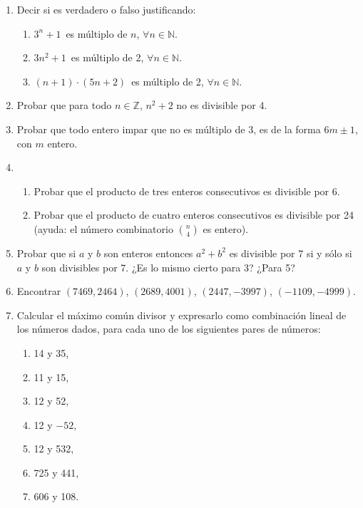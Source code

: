 \documentclass[a4paper,12pt,twoside,spanish,reqno]{amsbook}
\numberwithin{equation}{section}
\begin{document}
\begin{enumerate}
\item Decir si es verdadero o falso justificando:
  \begin{enumerate}
  \item $3^n+1$\, es múltiplo de $n$, $\forall n \in {\mathbb N}$.
  \item $3n^2+1$\, es múltiplo de 2, $\forall n \in {\mathbb N}$.
  \item $(n+1)\cdot (5n+2)$\, es múltiplo de 2, $\forall n \in {\mathbb N}$.
  \end{enumerate}


\item Probar que para todo $n \in {\mathbb Z}$, $n^2 + 2$ no es divisible por 4.


\item Probar que todo entero impar que no es múltiplo de 3, es de la forma $6m\pm 1$, con $m$ entero.


\item 
\begin{enumerate}
 \item Probar que el producto de tres enteros consecutivos es divisible por 6.
 \item Probar que el producto de cuatro enteros consecutivos es divisible por 24 (ayuda: el número combinatorio $\binom{n}{4}$ es entero).
\end{enumerate}


\item Probar que si $a$ y $b$ son enteros entonces $a^2+b^2$ es divisible por 7 si y sólo si $a$ y $b$ son divisibles por 7.
¿Es lo mismo cierto para 3? ¿Para 5?



\item Encontrar $(7469,2464)$, $(2689,4001)$, $(2447,-3997)$, $(-1109,-4999)$.


\item
Calcular el máximo común divisor y expresarlo como combinación lineal de los
números dados, para cada uno de  los siguientes pares de números:
\begin{multicols}{3}
\begin{enumerate}
  \item  14 y 35, 
    \item 11 y 15, 
    \item 12 y 52,
  \item 12 y $-52$,  
    \item 12 y 532,
    \item 725 y 441,
    \item 606 y 108.
\end{enumerate}
\end{multicols}





\end{enumerate}
\end{document}
